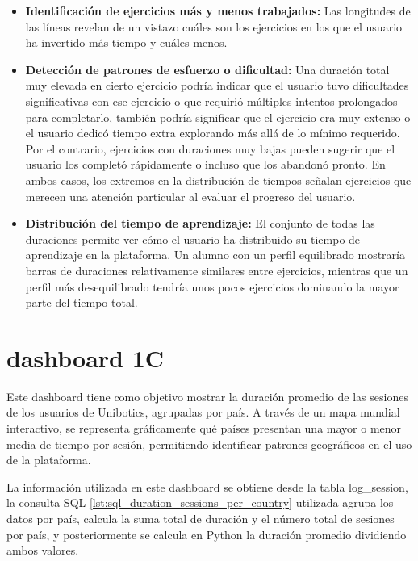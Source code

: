\documentclass[a4paper, 12pt]{book}
\begin{document}
\begin{itemize}
  \item \textbf{Identificación de ejercicios más y menos trabajados:} Las longitudes de las líneas revelan de un vistazo cuáles son los ejercicios en los que el usuario ha invertido más tiempo y cuáles menos.

  \item \textbf{Detección de patrones de esfuerzo o dificultad:} Una duración total muy elevada en cierto ejercicio podría indicar que el usuario tuvo dificultades significativas con ese ejercicio o que requirió múltiples intentos prolongados para completarlo, también podría significar que el ejercicio era muy extenso o el usuario dedicó tiempo extra explorando más allá de lo mínimo requerido. Por el contrario, ejercicios con duraciones muy bajas pueden sugerir que el usuario los completó rápidamente o incluso que los abandonó pronto. En ambos casos, los extremos en la distribución de tiempos señalan ejercicios que merecen una atención particular al evaluar el progreso del usuario.

  \item \textbf{Distribución del tiempo de aprendizaje:} El conjunto de todas las duraciones permite ver cómo el usuario ha distribuido su tiempo de aprendizaje en la plataforma. Un alumno con un perfil equilibrado mostraría barras de duraciones relativamente similares entre ejercicios, mientras que un perfil más desequilibrado tendría unos pocos ejercicios dominando la mayor parte del tiempo total.
\end{itemize}


\section{dashboard 1C}
    \label{sec:dash1c}


Este dashboard tiene como objetivo mostrar la duración promedio de las sesiones de los usuarios de Unibotics, agrupadas por país. A través de un mapa mundial interactivo, se representa gráficamente qué países presentan una mayor o menor media de tiempo por sesión, permitiendo identificar patrones geográficos en el uso de la plataforma.

La información utilizada en este dashboard se obtiene desde la tabla log\_session, la consulta SQL \ref{lst:sql_duration_sessions_per_country} utilizada agrupa los datos por país, calcula la suma total de duración y el número total de sesiones por país, y posteriormente se calcula en Python la duración promedio dividiendo ambos valores.
\end{document}
